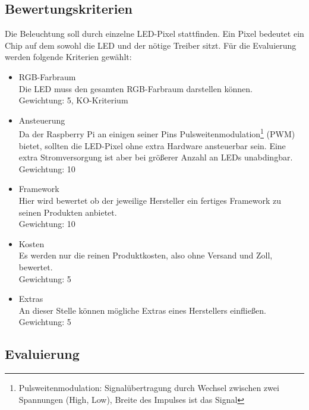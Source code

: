 
\subsection{Bewertungskriterien}
Die Beleuchtung soll durch einzelne LED-Pixel stattfinden. Ein Pixel bedeutet ein Chip auf dem sowohl die LED und der nötige Treiber sitzt. Für die Evaluierung werden folgende Kriterien gewählt:
\begin{itemize}
\item RGB-Farbraum \\
Die LED muss den gesamten RGB-Farbraum darstellen können. \\
Gewichtung: 5, KO-Kriterium
\item Ansteuerung \\
Da der Raspberry Pi an einigen seiner Pins Pulsweitenmodulation\footnote{Pulsweitenmodulation: Signalübertragung durch Wechsel zwischen zwei Spannungen (High, Low), Breite des Impulses ist das Signal} (PWM) bietet, sollten die LED-Pixel ohne extra Hardware ansteuerbar sein. Eine extra Stromversorgung ist aber bei größerer Anzahl an LEDs unabdingbar. \\
Gewichtung: 10
\item Framework \\
Hier wird bewertet ob der jeweilige Hersteller ein fertiges Framework zu seinen Produkten anbietet. \\
Gewichtung: 10
\item Kosten \\
Es werden nur die reinen Produktkosten, also ohne Versand und Zoll, bewertet. \\
Gewichtung: 5
\item Extras \\
An dieser Stelle können mögliche Extras eines Herstellers einfließen. \\
Gewichtung: 5
\end{itemize}

\subsection{Evaluierung}

